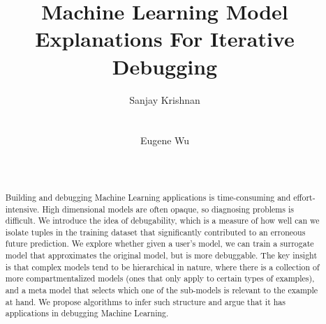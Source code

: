 \documentclass{sig-alternate}
\begin{document}
\newcommand{\gray}[1]{{{\textcolor{lightgray}{\{#1\}}}\xspace}}
\newcommand{\ewu}[1]{{{\textcolor{red}{\{ewu: #1\}}}\xspace}}
\newcommand{\reminder}[1]{{{\textcolor{magenta}{\{\{\bf #1\}\}}}\xspace}}
\newcommand{\specialcell}[2][c]{%
  \begin{tabular}[#1]{@{}c@{}}#2\end{tabular}}

\def\ojoin{\setbox0=\hbox{$\bowtie$}%
  \rule[-.02ex]{.25em}{.4pt}\llap{\rule[\ht0]{.25em}{.4pt}}}
\def\leftouterjoin{\mathbin{\ojoin\mkern-5.8mu\bowtie}}
\def\rightouterjoin{\mathbin{\bowtie\mkern-5.8mu\ojoin}}
\def\fullouterjoin{\mathbin{\ojoin\mkern-5.8mu\bowtie\mkern-5.8mu\ojoin}}


\pagestyle{plain}

%

\title{Machine Learning Model Explanations For Iterative Debugging}


\author{ 
\alignauthor
Sanjay Krishnan \\
 \\
\\
\alignauthor
Eugene Wu \\
 \\
\\
}




\maketitle

\begin{abstract}
Building and debugging Machine Learning applications is time-consuming and effort-intensive.
High dimensional models are often opaque, so diagnosing problems is difficult.
We introduce the idea of debugability, which is a measure of how well can we isolate tuples in the training dataset that significantly contributed to an erroneous future prediction.
We explore whether given a user's model, we can train a surrogate model that approximates the original model, but is more debuggable.
The key insight is that complex models tend to be hierarchical in nature, where there is a collection of more compartmentalized models (ones that only apply to certain types of examples), and a meta model that selects which one of the sub-models is relevant to the example at hand.
We propose algorithms to infer such structure and argue that it has applications in debugging Machine Learning.
\end{abstract}
\end{document}
